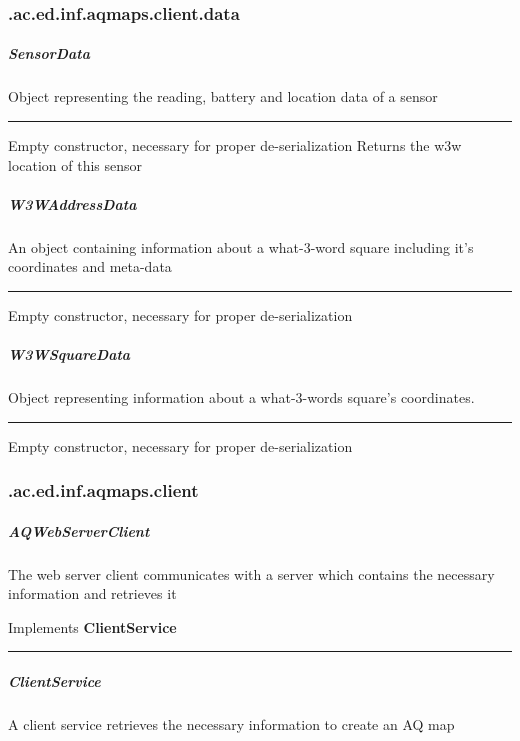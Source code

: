 \subsubsection{ .ac.ed.inf.aqmaps.client.data }
\subparagraph{ SensorData } Object representing the reading, battery and location data of a sensor
 
\hrule
\begin{mitem}
\scriptsize
	{Empty constructor, necessary for proper de{-}serialization}
	{Returns the w3w location of this sensor}
\end{mitem}

\subparagraph{ W3WAddressData } An object containing information about a what-3-word square including it's coordinates and meta-data
 
\hrule
\begin{mitem}
\scriptsize
	{Empty constructor, necessary for proper de{-}serialization}
	{}
\end{mitem}

\subparagraph{ W3WSquareData } Object representing information about a what-3-words square's coordinates.
 
\hrule
\begin{mitem}
\scriptsize
	{Empty constructor, necessary for proper de{-}serialization}
	{}
\end{mitem}

\subsubsection{ .ac.ed.inf.aqmaps.client }
\subparagraph{ AQWebServerClient } {The web server client communicates with a server which contains the necessary information and retrieves it}
 
Implements \textbf{ ClientService }
\hrule
\begin{mitem}
\scriptsize
	{}
	{}
\end{mitem}

\subparagraph{ ClientService } A client service retrieves the necessary information to create an AQ map
 
